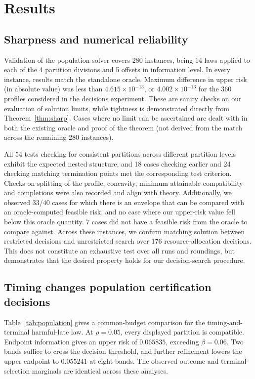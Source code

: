 \section{Results}\label{sec:results}
\subsection{Sharpness and numerical reliability}
Validation of the population solver covers 280 instances, being 14 laws applied to each of the 4 partition divisions and 5 offsets in information level. In every instance, results match the standalone oracle. Maximum difference in upper risk (in absolute value) was less than $4.615\times10^{-13}$, or $4.002\times10^{-13}$ for the 360 profiles considered in the decisions experiment. These are sanity checks on our evaluation of solution limits, while tightness is demonstrated directly from Theorem~\ref{thm:sharp}. Cases where no limit can be ascertained are dealt with in both the existing oracle and proof of the theorem (not derived from the match across the remaining 280 instances).

All 54 tests checking for consistent partitions across different partition levels exhibit the expected nested structure, and 18 cases checking earlier and 24 checking matching termination points met the corresponding test criterion. Checks on splitting of the profile, concavity, minimum attainable compatibility and completions were also recorded and align with theory. Additionally, we observed 33/40 cases for which there is an envelope that can be compared with an oracle-computed feasible risk, and no case where our upper-risk value fell below this oracle quantity. 7 cases did not have a feasible risk from the oracle to compare against. Across these instances, we confirm matching solution between restricted decisions and unrestricted search over 176 resource-allocation decisions. This does not constitute an exhaustive test over all runs and roundings, but demonstrates that the desired property holds for our decision-search procedure.
\subsection{Timing changes population certification decisions}
Table~\ref{tab:population} gives a common-budget comparison for the timing-and-terminal harmful-late law. At $\rho=0.05$, every displayed partition is compatible. Endpoint information gives an upper risk of $0.065835$, exceeding $\beta=0.06$. Two bands suffice to cross the decision threshold, and further refinement lowers the upper endpoint to $0.055241$ at eight bands. The observed outcome and terminal-selection marginals are identical across these analyses.

